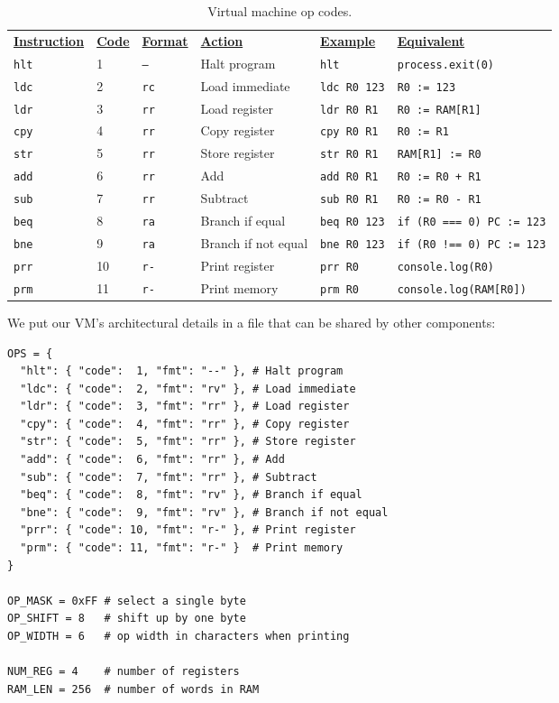 \documentclass{scrbook}
\begin{document}
\begin{table}
\begin{tabular}{llllll}
\textbf{\underline{Instruction}} & \textbf{\underline{Code}} & \textbf{\underline{Format}} & \textbf{\underline{Action}} & \textbf{\underline{Example}} & \textbf{\underline{Equivalent}} \\
\texttt{hlt} & 1 & \texttt{--} & Halt program & \texttt{hlt} & \texttt{process.exit(0)} \\
\texttt{ldc} & 2 & \texttt{rc} & Load immediate & \texttt{ldc R0 123} & \texttt{R0 := 123} \\
\texttt{ldr} & 3 & \texttt{rr} & Load register & \texttt{ldr R0 R1} & \texttt{R0 := RAM[R1]} \\
\texttt{cpy} & 4 & \texttt{rr} & Copy register & \texttt{cpy R0 R1} & \texttt{R0 := R1} \\
\texttt{str} & 5 & \texttt{rr} & Store register & \texttt{str R0 R1} & \texttt{RAM[R1] := R0} \\
\texttt{add} & 6 & \texttt{rr} & Add & \texttt{add R0 R1} & \texttt{R0 := R0 + R1} \\
\texttt{sub} & 7 & \texttt{rr} & Subtract & \texttt{sub R0 R1} & \texttt{R0 := R0 - R1} \\
\texttt{beq} & 8 & \texttt{ra} & Branch if equal & \texttt{beq R0 123} & \texttt{if (R0 === 0) PC := 123} \\
\texttt{bne} & 9 & \texttt{ra} & Branch if not equal & \texttt{bne R0 123} & \texttt{if (R0 !== 0) PC := 123} \\
\texttt{prr} & 10 & \texttt{r-} & Print register & \texttt{prr R0} & \texttt{console.log(R0)} \\
\texttt{prm} & 11 & \texttt{r-} & Print memory & \texttt{prm R0} & \texttt{console.log(RAM[R0])} \\
\end{tabular}
\caption{Virtual machine op codes.}
\label{vm-op-codes}
\end{table}



We put our VM's architectural details in a file
that can be shared by other components:


\begin{lstlisting}[frame=single,frameround=tttt]
OPS = {
  "hlt": { "code":  1, "fmt": "--" }, # Halt program
  "ldc": { "code":  2, "fmt": "rv" }, # Load immediate
  "ldr": { "code":  3, "fmt": "rr" }, # Load register
  "cpy": { "code":  4, "fmt": "rr" }, # Copy register
  "str": { "code":  5, "fmt": "rr" }, # Store register
  "add": { "code":  6, "fmt": "rr" }, # Add
  "sub": { "code":  7, "fmt": "rr" }, # Subtract
  "beq": { "code":  8, "fmt": "rv" }, # Branch if equal
  "bne": { "code":  9, "fmt": "rv" }, # Branch if not equal
  "prr": { "code": 10, "fmt": "r-" }, # Print register
  "prm": { "code": 11, "fmt": "r-" }  # Print memory
}

OP_MASK = 0xFF # select a single byte
OP_SHIFT = 8   # shift up by one byte
OP_WIDTH = 6   # op width in characters when printing

NUM_REG = 4    # number of registers
RAM_LEN = 256  # number of words in RAM
\end{lstlisting}
\end{document}
